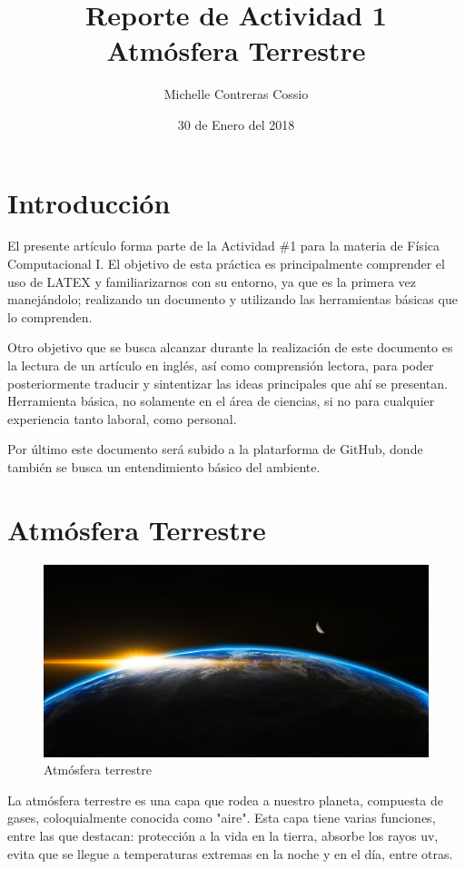 \documentclass{article}
\title{Reporte de Actividad 1 \\ Atmósfera Terrestre}
\author{Michelle Contreras Cossio}
\date{30 de Enero del 2018}
\begin{document}
\maketitle

\section{Introducción}

El presente artículo forma parte de la Actividad \#1 para la materia de Física Computacional I. El objetivo de esta práctica es principalmente comprender el uso de LATEX y familiarizarnos con su entorno, ya que es la primera vez manejándolo; realizando un documento y utilizando las herramientas básicas que lo comprenden. 

Otro objetivo que se busca alcanzar durante la realización de este documento es la lectura de un artículo en inglés, así como comprensión lectora, para poder posteriormente traducir y sintentizar las ideas principales que ahí se presentan. Herramienta básica, no solamente en el área de ciencias, si no para cualquier experiencia tanto laboral, como personal.

Por último este documento será subido a la platarforma de GitHub, donde también se busca un entendimiento básico del ambiente. 

\section{Atmósfera Terrestre}

\begin{figure}[h!]
  \includegraphics[scale=.4]{1.jpeg}
  \centering
  \caption{Atmósfera terrestre}
  \label{fig:1}
\end{figure}

La atmósfera terrestre es una capa que rodea a nuestro planeta, compuesta de gases, coloquialmente conocida como "aire". Esta capa tiene varias funciones, entre las que destacan: protección a la vida en la tierra, absorbe los rayos uv, evita que se llegue a temperaturas extremas en la noche y en el día, entre otras.
\end{document}
